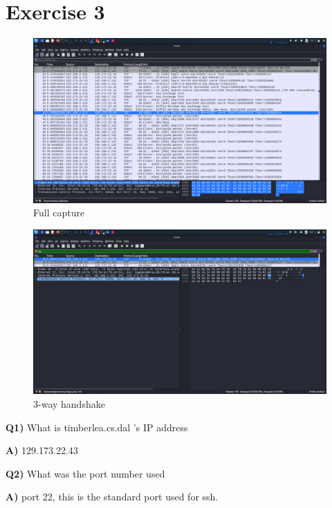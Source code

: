 \documentclass{article}
\numberwithin{equation}{subsection}
\begin{document}
	
	\newpage
	\section{Exercise 3}
	
	\begin{figure}[H]
		\caption{Full capture}
		\includegraphics[width=400pt]{pics/6.png}
	\end{figure}	


	\begin{figure}[H]
		\caption{3-way handshake}
		\includegraphics[width=400pt]{pics/5.png}
	\end{figure}	

	\begin{adjustwidth}{1em}{1em}
		\par{
			\textbf{Q1)} What is timberlea.cs.dal 's IP address
		}	
		\par{
			\textbf{A)}	129.173.22.43 
		}
	\vspace{10pt}
		\par{
			\textbf{Q2)} What was the port number used
		}
		\par{
			\textbf{A)} port 22, this is the standard port used for ssh.
		}
	\end{adjustwidth}
\end{document}
